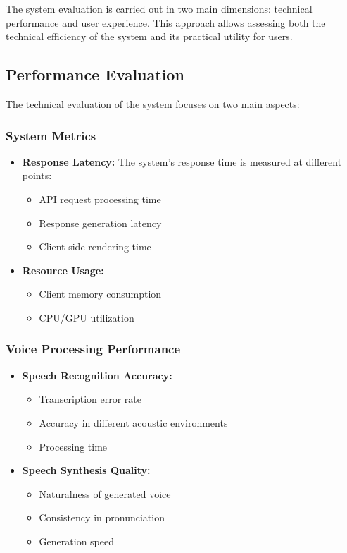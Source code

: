 The system evaluation is carried out in two main dimensions: technical performance and user experience. This approach allows assessing both the technical efficiency of the system and its practical utility for users.

\subsection{Performance Evaluation}
\label{evaluacion-rendimiento}

The technical evaluation of the system focuses on two main aspects:

\subsubsection{System Metrics}

\begin{itemize}
	\item \textbf{Response Latency:} The system's response time is measured at different points:
	      \begin{itemize}
		      \item API request processing time
		      \item Response generation latency
		      \item Client-side rendering time
	      \end{itemize}

	\item \textbf{Resource Usage:}
	      \begin{itemize}
		      \item Client memory consumption
		      \item CPU/GPU utilization
	      \end{itemize}
\end{itemize}

\subsubsection{Voice Processing Performance}

\begin{itemize}
	\item \textbf{Speech Recognition Accuracy:}
	      \begin{itemize}
		      \item Transcription error rate
		      \item Accuracy in different acoustic environments
		      \item Processing time
	      \end{itemize}

	\item \textbf{Speech Synthesis Quality:}
	      \begin{itemize}
		      \item Naturalness of generated voice
		      \item Consistency in pronunciation
		      \item Generation speed
	      \end{itemize}
\end{itemize}

